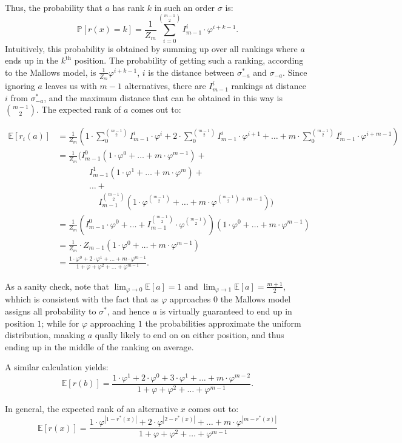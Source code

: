 \documentclass{article}
\theoremstyle{definition}
\renewcommand{\phi}{\varphi}
\newcommand{\PR}{\mathbb{P}}
\newcommand{\EX}{\mathbb{E}}
\begin{document}
    Thus, the probability that \(a\) has rank \(k\) in such an order \(\sigma\) is:
    \[
      \PR[r(x) = k] = \frac{1}{Z_m}\sum_{i=0}^{m-1\choose 2}I_{m-1}^i\cdot\phi^{i+k-1}.
    \]
    Intuitively, this probability is obtained by summing up over all rankings where \(a\) 
    ends up in the \(k^{\text{th}}\) position. 
    The probability of getting such a ranking, according to the Mallows model, 
    is \(\frac{1}{Z_m}\phi^{i+k-1}\),
    \(i\) is the distance between \(\sigma^*_{-a}\) and \(\sigma_{-a}\).
    Since ignoring \(a\) leaves us with \(m-1\) alternatives, there are \(I_{m-1}^i\) rankings at distance \(i\)
    from \(\sigma^*_{-a}\), and the maximum distance that can be obtained in this way is \(m-1\choose 2\).
    The expected rank of \(a\) comes out to:

    \begin{align*}
        \EX[r_i(a)] & = \frac{1}{Z_m}\left(1\cdot\sum_0^{m-1\choose 2}I_{m-1}^i\cdot\phi^i + 
        2\cdot\sum_0^{m-1\choose 2}I_{m-1}^i\cdot\phi^{i+1} + 
        \dots + 
        m\cdot \sum_0^{m-1\choose 2}I_{m-1}^i\cdot\phi^{i+m-1} \right)\\ 
        & = \frac{1}{Z_m}\Big(I_{m-1}^0 (1\cdot \phi^0+\dots+m\cdot\phi^{m-1}) + \\
        & ~~~~~~~~~~~~~~~~~I_{m-1}^1 (1\cdot \phi^1+ \dots + m\cdot\phi^{m}) +\\
        & ~~~~~~~~~~~~~~~~~\dots +\\
        & ~~~~~~~~~~~~~~~~~~~~~~I_{m-1}^{m-1\choose 2}(1\cdot \phi^{m-1\choose 2}+\dots+m\cdot\phi^{{m-1\choose 2}+m-1})\Big)\\ 
        & = \frac{1}{Z_m}\left(I_{m-1}^0\cdot\phi^0+\dots+I_{m-1}^{m-1\choose 2}\cdot\phi^{m-1\choose 2}\right)\left(1\cdot\phi^0+\dots+m\cdot\phi^{m-1}\right)\\ 
        & = \frac{1}{Z_m}\cdot Z_{m-1}\left(1\cdot\phi^0+\dots+m\cdot\phi^{m-1}\right)\\ 
        & = \frac{1\cdot\phi^0+2\cdot\phi^1+\dots+m\cdot\phi^{m-1}}{1+\phi+\phi^2+\dots+\phi^{m-1}}.
    \end{align*}

    As a sanity check, note that \(\lim_{\phi\rightarrow 0}\EX[a] = 1\) and \(\lim_{\phi\rightarrow 1}\EX[a] = \frac{m+1}{2}\), 
    whhich is consistent with the fact that as \(\phi\) approaches \(0\) the Mallows model assigns all probability to \(\sigma^*\),
    and hence \(a\) is virtually guaranteed to end up in position \(1\);
    while for \(\phi\) approaching \(1\) the probabilities approximate the uniform distribution,
    maaking \(a\) qually likely to end on on either position, and thus ending up in the middle of the ranking on average.

    A similar calculation yields:
    \[
      \EX[r(b)] = \frac{1\cdot \phi^1 + 2\cdot\phi^0 + 3\cdot\phi^1+\dots+m\cdot\phi^{m-2}}{1+\phi+\phi^2+\dots+\phi^{m-1}}.
    \]

    In general, the expected rank of an alternative \(x\) comes out to:
    \[
      \EX[r(x)] = \frac{1\cdot \phi^{|1-r^*(x)|} + 2\cdot\phi^{|2-r^*(x)|} +\dots+m\cdot\phi^{|m-r^*(x)|}}{1+\phi+\phi^2+\dots+\phi^{m-1}}
    \]


    
    
\end{document}
